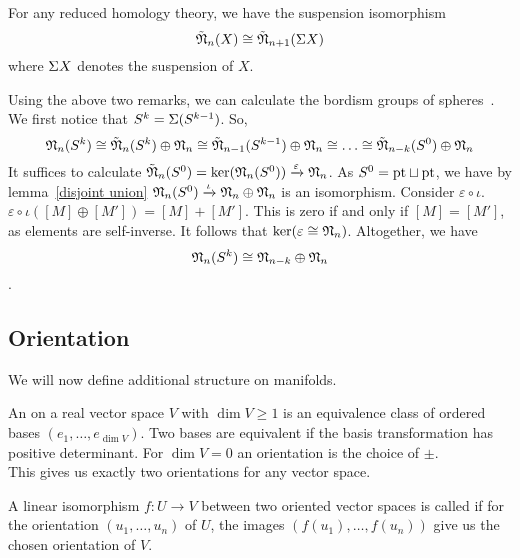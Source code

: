 \documentclass[a4paper,12pt]{article}
\begin{document}
\begin{remark}
    For any reduced homology theory, we have the suspension isomorphism \[\tilde{\mathfrak{N}}_n(X)\cong\tilde{\mathfrak{N}}_{n+1}(\Sigma X)\]
    where \(\Sigma X\) denotes the suspension of \(X\).
\end{remark}

Using the above two remarks, we can calculate the bordism groups of spheres\ \cite[Proposition 6.1]{zhang}. We first notice that \(S^k=\Sigma(S^{k-1})\). So,
\[\mathfrak{N}_n(S^k)\cong\tilde{\mathfrak{N}}_n(S^k)\oplus\mathfrak{N}_n\cong\tilde{\mathfrak{N}}_{n-1}(S^{k-1})\oplus\mathfrak{N}_n\cong\dots\cong\tilde{\mathfrak{N}}_{n-k}(S^0)\oplus\mathfrak{N}_n\]
It suffices to calculate \(\tilde{\mathfrak{N}}_n(S^0)=\ker(\mathfrak{N}_n(S^0))\xrightarrow{\varepsilon}\mathfrak{N}_n\). As \(S^0=\mathrm{pt}\sqcup\mathrm{pt}\), we have by lemma\ \ref{disjoint union} \(\mathfrak{N}_n(S^0)\xrightarrow{\iota}\mathfrak{N}_n\oplus\mathfrak{N}_n\) is an isomorphism. 
Consider \(\varepsilon\circ\iota\).\ \(\varepsilon\circ\iota([M]\oplus[M'])=[M]+[M']\). This is zero if and only if \([M]=[M']\), as elements are self-inverse. It follows that \(\ker(\varepsilon\cong\mathfrak{N}_n)\). 
Altogether, we have \[\mathfrak{N}_n(S^k)\cong\mathfrak{N}_{n-k}\oplus\mathfrak{N}_n\].

\subsection{Orientation}

We will now define additional  structure on manifolds.


\begin{definition}%
    An  on a real vector space \(V\) with \(\dim V\geq 1\) is an equivalence class of ordered bases \((e_1,\dots,e_{\dim V})\). Two bases are equivalent if the basis transformation has positive determinant. 
    For \(\dim V=0\) an orientation is the choice of \(\pm\).\\
    This gives us exactly two orientations for any vector space.
\end{definition}

\begin{definition}
    A linear isomorphism \(f:U\to V\) between two oriented vector spaces is called  if for the orientation \((u_1,\dots,u_n)\) of \(U\), the images \((f(u_1),\dots,f(u_n))\) give us the chosen orientation of \(V\).
\end{definition}
\end{document}
